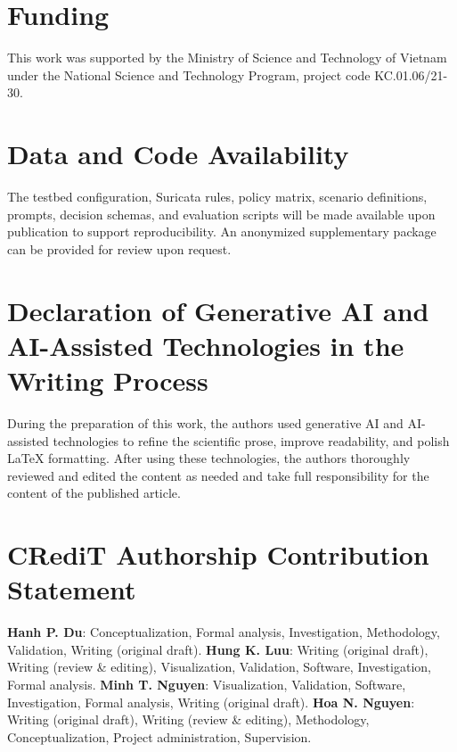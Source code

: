 \documentclass[final,5p]{elsarticle}
\begin{document}
\section*{Funding}
This work was supported by the Ministry of Science and Technology of Vietnam under the National Science and Technology Program, project code KC.01.06/21-30.

\section*{Data and Code Availability}
The testbed configuration, Suricata rules, policy matrix, scenario definitions, prompts, decision schemas, and evaluation scripts will be made available upon publication to support reproducibility. An anonymized supplementary package can be provided for review upon request.

\section*{Declaration of Generative AI and AI-Assisted Technologies in the Writing Process}
During the preparation of this work, the authors used generative AI and AI-assisted technologies to refine the scientific prose, improve readability, and polish LaTeX formatting. After using these technologies, the authors thoroughly reviewed and edited the content as needed and take full responsibility for the content of the published article.

\section*{CRediT Authorship Contribution Statement}
\textbf{Hanh P. Du}: Conceptualization, Formal analysis, Investigation, Methodology, Validation, Writing (original draft).
\noindent \textbf{Hung K. Luu}: Writing (original draft), Writing (review \& editing), Visualization, Validation, Software, Investigation, Formal analysis.
\textbf{Minh T. Nguyen}: Visualization, Validation, Software, Investigation, Formal analysis, Writing (original draft).
\textbf{Hoa N. Nguyen}: Writing (original draft), Writing (review \& editing), Methodology, Conceptualization, Project administration, Supervision.




\end{document}
